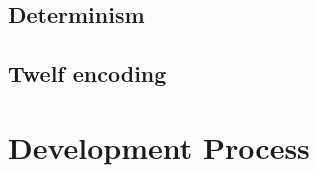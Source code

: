 \documentclass[a4paper, oneside, 10pt, draft]{memoir}
\begin{document}
\section{Determinism}

\section{Twelf encoding}

\chapter{Development Process}

\newcommand{\fskip}{\mathbf{skip}}
\newcommand{\fsemi}[2]{#1 \; ; \; #2}
\newcommand{\fcall}[1]{\mathbf{call} \; #1}
\newcommand{\fpgm}[2]{\mathbf{def} \; #1 \; \mathbf{in} \; #2}
\end{document}
